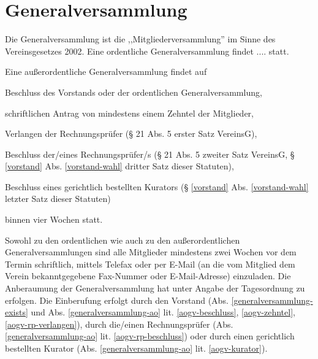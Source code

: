 \documentclass{article}
\begin{document}
\section{Generalversammlung}\label{generalversammlung}
\begin{absatz}
    \item \label{generalversammlung-exists} Die Generalversammlung ist die ,,Mitgliederversammlung'' im Sinne des Vereinsgesetzes 2002. Eine ordentliche Generalversammlung findet
    ....  statt.
    \item \label{generalversammlung-ao} Eine außerordentliche Generalversammlung findet auf
    \begin{littera}
        \item \label{aogv-beschluss} Beschluss des Vorstands oder der ordentlichen Generalversammlung,
        \item \label{aogv-zehntel} schriftlichen Antrag von mindestens einem Zehntel der Mitglieder,
        \item \label{aogv-rp-verlangen} Verlangen der Rechnungsprüfer (§ 21 Abs. 5 erster Satz VereinsG),
        \item \label{aogv-rp-beschluss} Beschluss der/eines Rechnungsprüfer/s (§ 21 Abs. 5 zweiter Satz VereinsG, § \ref{vorstand} Abs. \ref{vorstand-wahl} dritter Satz dieser Statuten),
        \item \label{aogv-kurator} Beschluss eines gerichtlich bestellten Kurators (§ \ref{vorstand} Abs. \ref{vorstand-wahl} letzter Satz dieser Statuten)
    \end{littera}
    binnen vier Wochen statt.
    \item Sowohl zu den ordentlichen wie auch zu den außerordentlichen Generalversammlungen sind alle Mitglieder mindestens zwei Wochen vor dem Termin schriftlich, mittels Telefax oder per E-Mail (an die vom Mitglied dem Verein bekanntgegebene Fax-Nummer oder E-Mail-Adresse) einzuladen. Die Anberaumung der Generalversammlung hat unter Angabe der Tagesordnung zu erfolgen. Die Einberufung erfolgt durch den Vorstand (Abs. \ref{generalversammlung-exists} und Abs. \ref{generalversammlung-ao} lit. \ref{aogv-beschluss}, \ref{aogv-zehntel}, \ref{aogv-rp-verlangen}), durch die/einen Rechnungsprüfer (Abs. \ref{generalversammlung-ao} lit. \ref{aogv-rp-beschluss}) oder durch einen gerichtlich bestellten Kurator (Abs. \ref{generalversammlung-ao} lit. \ref{aogv-kurator}).

\end{absatz}
\end{document}
